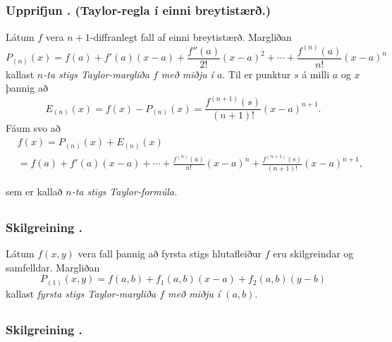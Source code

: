 \subsection{} 

\subsubsection{Upprifjun \kaflanr. (Taylor-regla í einni breytistærð.)}
  Látum 
$f$ vera $n+1$-diffranlegt fall af einni breytistærð.  Margliðan 
$$P_{(n)}(x)=f(a)+f'(a)(x-a)+\frac{f''(a)}{2!}(x-a)^2
+\cdots+\frac{f^{(n)}(a)}{n!}(x-a)^n$$
kallast {\em $n$-ta stigs Taylor-margliða $f$ með miðju í $a$}.
Til er punktur $s$ á milli $a$ og $x$ þannig að 
$$E_{(n)}(x)=f(x)-P_{(n)}(x)=\frac{f^{(n+1)}(s)}{(n+1)!}(x-a)^{n+1}.$$
Fáum svo að 
\begin {align*}
&f(x)=P_{(n)}(x)+E_{(n)}(x) \\
&=f(a)+f'(a)(x-a)+\cdots+\frac{f^{(n)}(a)}{n!}(x-a)^n
+\frac{f^{(n+1)}(s)}{(n+1)!}(x-a)^{n+1}, 
\end {align*}

 
sem er kallað {\em $n$-ta stigs Taylor-formúla.}






\subsection{} 

\subsubsection{Skilgreining \kaflanr.}
 Látum $f(x,y)$ vera fall þannig að fyrsta stigs hlutafleiður $f$ eru skilgreindar og samfelldar.  Margliðan
$$P_{(1)}(x,y)=f(a,b)+f_1(a,b)(x-a)+f_2(a,b)(y-b)$$
kallast {\em fyrsta stigs Taylor-margliða $f$ með miðju í $(a,b)$}. 






\subsection{} 

\subsubsection{Skilgreining \kaflanr.}

